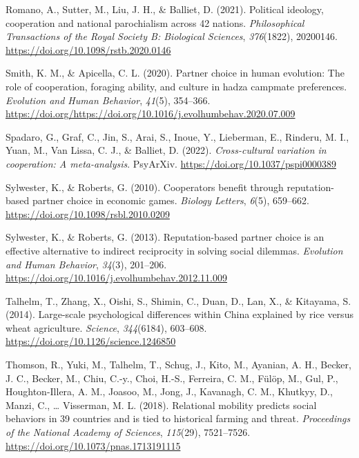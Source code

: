 \documentclass[english,man,floatsintext]{apa6}
\begin{document}
\leavevmode\hypertarget{ref-Angelo2021}{}%
Romano, A., Sutter, M., Liu, J. H., \& Balliet, D. (2021). Political ideology, cooperation and national parochialism across 42 nations. \emph{Philosophical Transactions of the Royal Society B: Biological Sciences}, \emph{376}(1822), 20200146. \url{https://doi.org/10.1098/rstb.2020.0146}

\leavevmode\hypertarget{ref-Smith2020}{}%
Smith, K. M., \& Apicella, C. L. (2020). Partner choice in human evolution: The role of cooperation, foraging ability, and culture in hadza campmate preferences. \emph{Evolution and Human Behavior}, \emph{41}(5), 354--366. \url{https://doi.org/https://doi.org/10.1016/j.evolhumbehav.2020.07.009}

\leavevmode\hypertarget{ref-Spadaro_preprint}{}%
Spadaro, G., Graf, C., Jin, S., Arai, S., Inoue, Y., Lieberman, E., Rinderu, M. I., Yuan, M., Van Lissa, C. J., \& Balliet, D. (2022). \emph{Cross-cultural variation in cooperation: A meta-analysis}. PsyArXiv. \url{https://doi.org/10.1037/pspi0000389}

\leavevmode\hypertarget{ref-Sylwester2010}{}%
Sylwester, K., \& Roberts, G. (2010). Cooperators benefit through reputation-based partner choice in economic games. \emph{Biology Letters}, \emph{6}(5), 659--662. \url{https://doi.org/10.1098/rsbl.2010.0209}

\leavevmode\hypertarget{ref-Sylwester2013}{}%
Sylwester, K., \& Roberts, G. (2013). Reputation-based partner choice is an effective alternative to indirect reciprocity in solving social dilemmas. \emph{Evolution and Human Behavior}, \emph{34}(3), 201--206. \url{https://doi.org/10.1016/j.evolhumbehav.2012.11.009}

\leavevmode\hypertarget{ref-Talhelm2014}{}%
Talhelm, T., Zhang, X., Oishi, S., Shimin, C., Duan, D., Lan, X., \& Kitayama, S. (2014). Large-scale psychological differences within China explained by rice versus wheat agriculture. \emph{Science}, \emph{344}(6184), 603--608. \url{https://doi.org/10.1126/science.1246850}

\leavevmode\hypertarget{ref-Thomson2018}{}%
Thomson, R., Yuki, M., Talhelm, T., Schug, J., Kito, M., Ayanian, A. H., Becker, J. C., Becker, M., Chiu, C.-y., Choi, H.-S., Ferreira, C. M., Fülöp, M., Gul, P., Houghton-Illera, A. M., Joasoo, M., Jong, J., Kavanagh, C. M., Khutkyy, D., Manzi, C., \ldots{} Visserman, M. L. (2018). Relational mobility predicts social behaviors in 39 countries and is tied to historical farming and threat. \emph{Proceedings of the National Academy of Sciences}, \emph{115}(29), 7521--7526. \url{https://doi.org/10.1073/pnas.1713191115}
\end{document}
